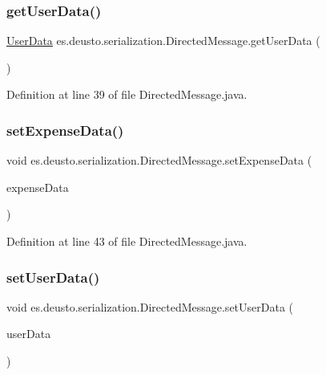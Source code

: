 \subsubsection{\texorpdfstring{get\+User\+Data()}{getUserData()}}
{\footnotesize\ttfamily \hyperlink{classes_1_1deusto_1_1serialization_1_1_user_data}{User\+Data} es.\+deusto.\+serialization.\+Directed\+Message.\+get\+User\+Data (\begin{DoxyParamCaption}{ }\end{DoxyParamCaption})}



Definition at line 39 of file Directed\+Message.\+java.

\mbox{\label{classes_1_1deusto_1_1serialization_1_1_directed_message_a2f339d3849855fd1fc88cdf6a6c3e2cf}} 
\subsubsection{\texorpdfstring{set\+Expense\+Data()}{setExpenseData()}}
{\footnotesize\ttfamily void es.\+deusto.\+serialization.\+Directed\+Message.\+set\+Expense\+Data (\begin{DoxyParamCaption}\item[{\hyperlink{classes_1_1deusto_1_1serialization_1_1_expense_data}{Expense\+Data}}]{expense\+Data }\end{DoxyParamCaption})}



Definition at line 43 of file Directed\+Message.\+java.

\mbox{\label{classes_1_1deusto_1_1serialization_1_1_directed_message_a4a3f7852410bc29d73179294836e84c4}} 
\subsubsection{\texorpdfstring{set\+User\+Data()}{setUserData()}}
{\footnotesize\ttfamily void es.\+deusto.\+serialization.\+Directed\+Message.\+set\+User\+Data (\begin{DoxyParamCaption}\item[{\hyperlink{classes_1_1deusto_1_1serialization_1_1_user_data}{User\+Data}}]{user\+Data }\end{DoxyParamCaption})}

